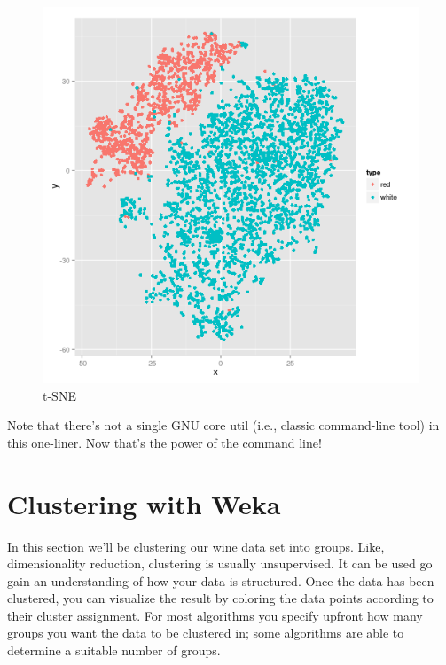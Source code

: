 \documentclass[
]{book}
\theoremstyle{definition}
\theoremstyle{definition}
\theoremstyle{definition}
\theoremstyle{remark}
\begin{document}
\begin{figure}

{\centering \includegraphics[width=7in]{images/tapkee-wine-t-sne} 

}

\caption{t-SNE}\label{fig:unnamed-chunk-17}
\end{figure}

Note that there's not a single GNU core util (i.e., classic command-line tool) in this one-liner. Now that's the power of the command line!

\hypertarget{clustering-with-weka}{%
\section{Clustering with Weka}\label{clustering-with-weka}}

In this section we'll be clustering our wine data set into groups. Like, dimensionality reduction, clustering is usually unsupervised. It can be used go gain an understanding of how your data is structured. Once the data has been clustered, you can visualize the result by coloring the data points according to their cluster assignment. For most algorithms you specify upfront how many groups you want the data to be clustered in; some algorithms are able to determine a suitable number of groups.
\end{document}
